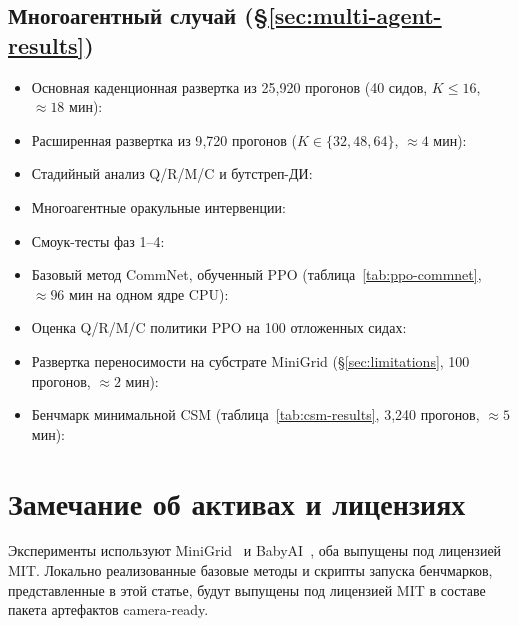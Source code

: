 \documentclass{article}
\begin{document}
\subsection*{Многоагентный случай (\S\ref{sec:multi-agent-results})}
\begin{itemize}[leftmargin=16pt]
\item Основная каденционная развертка из 25{,}920 прогонов (40 сидов, $K\le 16$, $\approx 18$ мин):
\item Расширенная развертка из 9{,}720 прогонов ($K\in\{32,48,64\}$, $\approx 4$ мин):
\item Стадийный анализ Q/R/M/C и бутстреп-ДИ:
\item Многоагентные оракульные интервенции:
\item Смоук-тесты фаз 1--4:
\item Базовый метод CommNet, обученный PPO (таблица~\ref{tab:ppo-commnet}, $\approx 96$ мин на одном ядре CPU):
\item Оценка Q/R/M/C политики PPO на 100 отложенных сидах:
\item Развертка переносимости на субстрате MiniGrid (\S\ref{sec:limitations}, 100 прогонов, $\approx 2$ мин):
\item Бенчмарк минимальной CSM (таблица~\ref{tab:csm-results}, 3{,}240 прогонов, $\approx 5$ мин):
\end{itemize}

\section{Замечание об активах и лицензиях}
\label{app:assets}

Эксперименты используют MiniGrid~\citep{MinigridMiniworld23} и BabyAI~\citep{chevalier2018babyai}, оба выпущены под лицензией MIT. Локально реализованные базовые методы и скрипты запуска бенчмарков, представленные в этой статье, будут выпущены под лицензией MIT в составе пакета артефактов camera-ready.

\clearpage
\FloatBarrier
%
\end{document}
